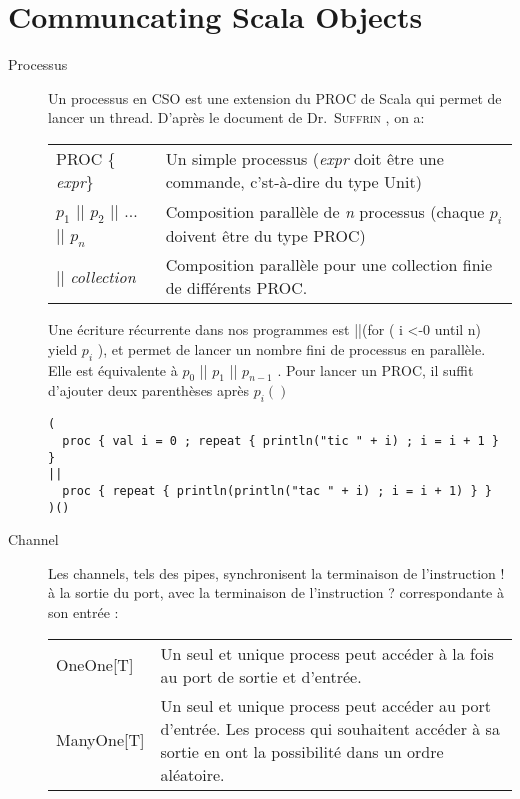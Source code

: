 \documentclass[a4paper,11pt,french]{report}
\begin{document}
\section{Communcating Scala Objects}
\begin{description}
\item[Processus] Un processus en CSO est une extension du PROC de Scala qui permet de lancer un thread. D'après le document de Dr.\ \textsc{Suffrin} \cite{cpa2008-cso}, on a:
\begin{center}
\begin{tabular}{lp{}}
\textsc{PROC} \{ \emph{expr}\} & Un simple processus (\emph{expr} doit être une commande, c'st-à-dire du type \textsf{Unit})\\ 
\emph{$p_{1}$} || \emph{$p_{2}$} || ... || \emph{$p_{n}$}  & Composition parallèle de \emph{n} processus (chaque \emph{$p_{i}$} doivent être du type \textsc{PROC})\\
|| \emph{collection} & Composition parallèle pour une collection finie de différents \textsc{PROC}. \\ 
\end{tabular} 
\end{center}
Une écriture récurrente dans nos programmes est \textsf{||(for ( i <-0 until n) yield $p_{i}$ )}, et permet de lancer un nombre fini de processus en parallèle. Elle est équivalente à \textsf{ $p_{0}$ ||  $p_{1}$ ||  $p_{n-1}$ }.
Pour lancer un \textsc{PROC}, il suffit d'ajouter deux parenthèses après \textsf{$p_i()$}

\begin{lstlisting}[frame=trBL]
( 
  proc { val i = 0 ; repeat { println("tic " + i) ; i = i + 1 } }
|| 
  proc { repeat { println(println("tac " + i) ; i = i + 1) } }
)()
\end{lstlisting}

\item[Channel] Les \textsf{channels}, tels des pipes, synchronisent la terminaison de l'instruction \textsf{!} à la sortie du port, avec la terminaison de l'instruction \textsf{?} correspondante à son entrée :

\begin{center}
\begin{tabular}{lp{}}
\textsf{OneOne[T]} & Un seul et unique process peut accéder à la fois au port de sortie et d'entrée.\\

\textsf{ManyOne[T]} & Un seul et unique process peut accéder au port d'entrée. Les process qui souhaitent accéder à sa sortie en ont la possibilité dans un ordre aléatoire.\\


\end{tabular}
\end{center}
\end{description}
\end{document}
